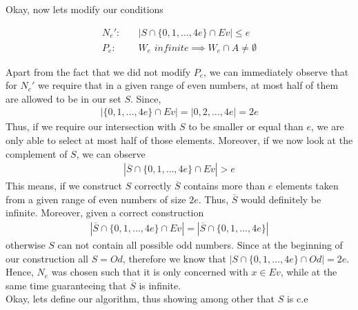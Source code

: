 \documentclass[11pt,a4paper]{article}
\begin{document}
Okay, now lets modify our conditions
 
\begin{equation*}
\begin{split}
N_e': & \quad |S \cap \{0, 1, \ldots , 4e\} \cap Ev| \leq e \\
P_e: & \quad W_e \textit{ infinite} \implies W_e \cap A \neq \emptyset
\end{split}
\end{equation*}

Apart from the fact that we did not modify $P_e$, we can immediately observe that for $N_e'$
we require that in a given range of even numbers, 
at most half of them are allowed to be in our set $S$. Since,
\begin{equation*}
\begin{split}
|\{0, 1, \ldots , 4e\} \cap Ev| = |{0, 2, \ldots , 4e}| = 2e
\end{split}
\end{equation*}
Thus, if we require our intersection with $S$ to be smaller or equal than $e$, we are only able to select at most half of those 
elements. Moreover, if we now look at the complement of $S$, we can observe
\begin{equation*}
\begin{split}
|\overline{S} \cap \{0, 1, \ldots , 4e\} \cap Ev| > e
\end{split}
\end{equation*}
This means, if we construct $S$ correctly $\overline{S}$ contains more than $e$ elements 
taken from a given range of even numbers of size $2e$. Thus, $\overline{S}$ would definitely be infinite. 
Moreover, given a correct construction
\begin{equation*}
\begin{split}
|\overline{S} \cap \{0, 1, \ldots , 4e\} \cap Ev| = |\overline{S} \cap \{0, 1, \ldots , 4e\}|
\end{split}
\end{equation*}
otherwise $S$ can not contain all possible odd numbers.
Since at the beginning of our construction all $S=Od$, therefore we know that 
$|S \cap \{0, 1, \ldots , 4e\} \cap Od| = 2e$. Hence, $N_e$ was chosen such that it is only concerned with $x \in Ev$, while 
at the same time guaranteeing that $\overline{S}$ is infinite. \\
Okay, lets define our algorithm, thus showing among other that $S$ is c.e
\end{document}
